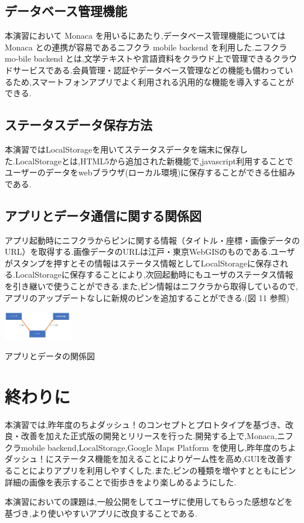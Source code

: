 \documentclass[a4paper, twoside]{jarticle}
\makeatletter
\newenvironment{figurehere}
  {\def\@captype{figure}}
  {}
\makeatother
\begin{document}
\begin{multicols}{2}
\subsection{データベース管理機能}
本演習において Monaca を用いるにあたり,データベース管理機能については Monaca との連携が容易であるニフクラ mobile backend を利用した.ニフクラ mo-bile backend とは,文学テキストや言語資料をクラウド上で管理できるクラウドサービスである.会員管理・認証やデータベース管理などの機能も備わっているため,スマートフォンアプリでよく利用される汎用的な機能を導入することができる.

\subsection{ステータスデータ保存方法}
本演習ではLocalStorageを用いてステータスデータを端末に保存した.LocalStorageとは,HTML5から追加された新機能で,javascript利用することでユーザーのデータをwebブラウザ(ローカル環境)に保存することができる仕組みである.

\subsection{アプリとデータ通信に関する関係図}
アプリ起動時にニフクラからピンに関する情報（タイトル・座標・画像データのURL）を取得する.画像データのURLは江戸・東京WebGISのものである.ユーザがスタンプを押すとその情報はステータス情報としてLocalStorageに保存される.LocalStorageに保存することにより,次回起動時にもユーザのステータス情報を引き継いで使うことができる.また,ピン情報はニフクラから取得しているので,アプリのアップデートなしに新規のピンを追加することができる.(図 11 参照)
\begin{figurehere}
\begin{center}
\includegraphics[bb=30 100 550 500,width=3cm]{./image12.png}%
\end{center}
\caption{アプリとデータの関係図}\label{fig:12}
\end{figurehere}


\section{終わりに}
本演習では,昨年度のちよダッシュ！のコンセプトとプロトタイプを基づき、改良・改善を加えた正式版の開発とリリースを行った.開発する上で,Monaca,ニフクラmobile backend,LocalStorage,Google Maps Platform を使用し,昨年度のちよダッシュ！にステータス機能を加えることによりゲーム性を高め,GUIを改善することによりアプリを利用しやすくした.また,ピンの種類を増やすとともにピン詳細の画像を表示することで街歩きをより楽しめるようにした.\par
本演習においての課題は,一般公開をしてユーザに使用してもらった感想などを基づき,より使いやすいアプリに改良することである.



\end{multicols} %
\end{document}
